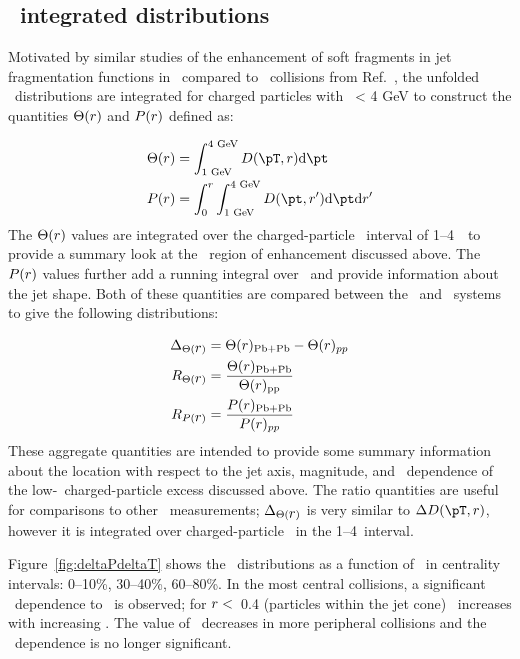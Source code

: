 \subsection{\pt\ integrated distributions}
\label{sec:discussion_int}
Motivated by similar studies of the enhancement of soft fragments in 
jet fragmentation functions in \pbpb\ compared to \pp\ collisions from Ref.~\cite{Aaboud:2018hpb}, the unfolded \Dptr\ distributions are integrated for charged particles with \pt\ < 4 GeV to construct the quantities $\Theta(\mbox{$r$})$ and $P(\mbox{$r$})$ defined as:

\begin{align*}
   \Theta(\rvar) &= \int_{1 \text{ GeV}}^{4 \text{ GeV}} \Dptr  \fd \pt \\
   P(\rvar) &= \int_0^r \int_{1 \text{ GeV}}^{4 \text{ GeV}} D(\pt, r') \fd \pt \fd r'
\end{align*}
The $\Theta(\mbox{$r$})$ values are integrated over the charged-particle \pt\ interval of 1--4~\GeV\ to provide a summary look at
the \pt\ region of enhancement discussed above.  The $P(\mbox{$r$})$ values further add a running integral over \rvar\
and provide information about the jet shape.
Both of these quantities are compared between the \pp\ and \pbpb\ systems to give the following distributions:

\begin{align*}
   \Delta_{\Theta(\mbox{$r$})} &= \Theta(\mbox{$r$})_{\mathrm{Pb+Pb}} - \Theta(\mbox{$r$})_{pp} \\
   R_{\Theta(\mbox{$r$})} &= \frac{\Theta(\mbox{$r$})_{\mathrm{Pb+Pb}}}{\Theta(\mbox{$r$})_{\mathrm{pp}}} \\
   R_{P(\mbox{$r$})} &= \frac{P(\mbox{$r$})_{\mathrm{Pb+Pb}}}{P(\mbox{$r$})_{pp}}
\end{align*}
These aggregate quantities are intended to provide some summary information about the location with respect to the 
jet axis, magnitude, and \ptjet\ dependence of the low-\pt\ charged-particle excess discussed above.
The ratio quantities are useful for comparisons to other \pbpb\ measurements; $\Delta_{\Theta(\mbox{$r$})}$ is very similar 
to $\DeltaDptr$, however it is integrated over charged-particle \pt\ in the 1--4~\GeV interval.

Figure~\ref{fig:deltaPdeltaT} shows the \DeltaTheta\ distributions as a function of \rvar\ in centrality intervals: 0--10\%, 30--40\%, 60--80\%.
In the most central collisions, a significant \ptjet\ dependence to \DeltaTheta\ is observed; for $\mbox{$r$} <$~0.4 (particles
within the jet cone) \DeltaTheta\ increases with increasing \ptjet.
The value of \DeltaTheta\ decreases in more peripheral collisions and the \ptjet\ dependence is no longer significant.

